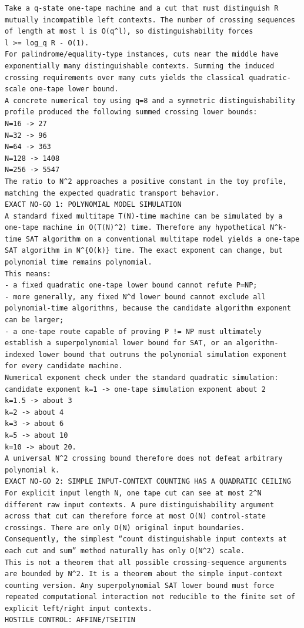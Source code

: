 \documentclass[11pt]{article}
\begin{document}
\begin{Verbatim}[breaklines=true,breakanywhere=true]
Take a q-state one-tape machine and a cut that must distinguish R mutually incompatible left contexts. The number of crossing sequences of length at most l is O(q^l), so distinguishability forces
l >= log_q R - O(1).
For palindrome/equality-type instances, cuts near the middle have exponentially many distinguishable contexts. Summing the induced crossing requirements over many cuts yields the classical quadratic-scale one-tape lower bound.
A concrete numerical toy using q=8 and a symmetric distinguishability profile produced the following summed crossing lower bounds:
N=16 -> 27
N=32 -> 96
N=64 -> 363
N=128 -> 1408
N=256 -> 5547
The ratio to N^2 approaches a positive constant in the toy profile, matching the expected quadratic transport behavior.
EXACT NO-GO 1: POLYNOMIAL MODEL SIMULATION
A standard fixed multitape T(N)-time machine can be simulated by a one-tape machine in O(T(N)^2) time. Therefore any hypothetical N^k-time SAT algorithm on a conventional multitape model yields a one-tape SAT algorithm in N^{O(k)} time. The exact exponent can change, but polynomial time remains polynomial.
This means:
- a fixed quadratic one-tape lower bound cannot refute P=NP;
- more generally, any fixed N^d lower bound cannot exclude all polynomial-time algorithms, because the candidate algorithm exponent can be larger;
- a one-tape route capable of proving P != NP must ultimately establish a superpolynomial lower bound for SAT, or an algorithm-indexed lower bound that outruns the polynomial simulation exponent for every candidate machine.
Numerical exponent check under the standard quadratic simulation:
candidate exponent k=1 -> one-tape simulation exponent about 2
k=1.5 -> about 3
k=2 -> about 4
k=3 -> about 6
k=5 -> about 10
k=10 -> about 20.
A universal N^2 crossing bound therefore does not defeat arbitrary polynomial k.
EXACT NO-GO 2: SIMPLE INPUT-CONTEXT COUNTING HAS A QUADRATIC CEILING
For explicit input length N, one tape cut can see at most 2^N different raw input contexts. A pure distinguishability argument across that cut can therefore force at most O(N) control-state crossings. There are only O(N) original input boundaries. Consequently, the simplest “count distinguishable input contexts at each cut and sum” method naturally has only O(N^2) scale.
This is not a theorem that all possible crossing-sequence arguments are bounded by N^2. It is a theorem about the simple input-context counting version. Any superpolynomial SAT lower bound must force repeated computational interaction not reducible to the finite set of explicit left/right input contexts.
HOSTILE CONTROL: AFFINE/TSEITIN

\end{Verbatim}
\end{document}
